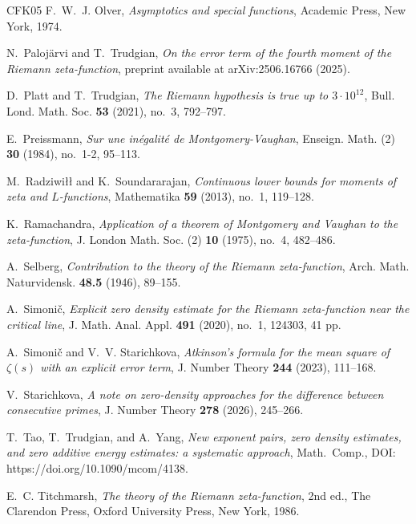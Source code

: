 \documentclass[a4paper,reqno]{amsart}
\theoremstyle{definition}
\begin{document}
\begin{thebibliography}{CFK{\etalchar{+}}05}
F.~W.~J. Olver, \emph{Asymptotics and special functions}, Academic Press, New York, 1974.

N.~Paloj\"{a}rvi and T.~Trudgian, \emph{On the error term of the fourth moment of the {R}iemann zeta-function}, preprint available at arXiv:2506.16766 (2025).

D.~Platt and T.~Trudgian, \emph{The {R}iemann hypothesis is true up to {$3\cdot10^{12}$}}, Bull. Lond. Math. Soc. \textbf{53} (2021), no.~3, 792--797.

E.~Preissmann, \emph{Sur une in\'{e}galit\'{e} de {M}ontgomery-{V}aughan}, Enseign. Math. (2) \textbf{30} (1984), no.~1-2, 95--113.

M.~Radziwi\l{\l} and K.~Soundararajan, \emph{Continuous lower bounds for moments of zeta and {$L$}-functions}, Mathematika \textbf{59} (2013), no.~1, 119--128.

K.~Ramachandra, \emph{Application of a theorem of {M}ontgomery and {V}aughan to the zeta-function}, J. London Math. Soc. (2) \textbf{10} (1975), no.~4, 482--486.

A.~Selberg, \emph{Contribution to the theory of the {R}iemann zeta-function}, Arch. Math. Naturvidensk. \textbf{48.5} (1946), 89--155.

A.~Simoni\v{c}, \emph{Explicit zero density estimate for the {R}iemann zeta-function near the critical line}, J. Math. Anal. Appl. \textbf{491} (2020), no.~1, 124303, 41 pp.

A.~Simoni\v{c} and V.~V. Starichkova, \emph{Atkinson's formula for the mean square of {$\zeta(s)$} with an explicit error term}, J. Number Theory \textbf{244} (2023), 111--168.

V.~Starichkova, \emph{A note on zero-density approaches for the difference between consecutive primes}, J. Number Theory \textbf{278} (2026), 245--266.

T.~Tao, T.~Trudgian, and A.~Yang, \emph{New exponent pairs, zero density estimates, and zero additive energy estimates: a systematic approach}, Math.~Comp., DOI: https://doi.org/10.1090/mcom/4138.

E.~C. Titchmarsh, \emph{The theory of the {R}iemann zeta-function}, 2nd ed., The Clarendon Press, Oxford University Press, New York, 1986.

\end{thebibliography}
\end{document}
